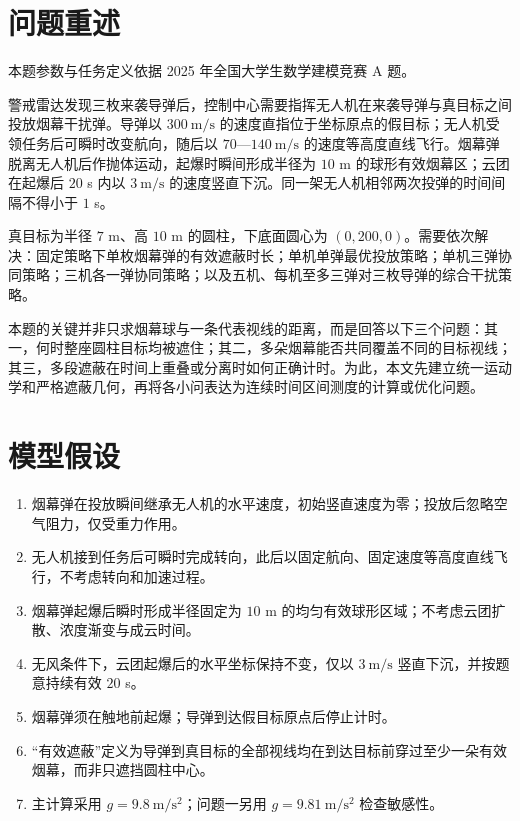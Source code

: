 \section{问题重述}
本题参数与任务定义依据 2025 年全国大学生数学建模竞赛 A 题\cite{cumcm2025a}。

警戒雷达发现三枚来袭导弹后，控制中心需要指挥无人机在来袭导弹与真目标之间投放烟幕干扰弹。导弹以 $300\ \mathrm{m/s}$ 的速度直指位于坐标原点的假目标；无人机受领任务后可瞬时改变航向，随后以 $70$—$140\ \mathrm{m/s}$ 的速度等高度直线飞行。烟幕弹脱离无人机后作抛体运动，起爆时瞬间形成半径为 $10$ m 的球形有效烟幕区；云团在起爆后 $20$ s 内以 $3\ \mathrm{m/s}$ 的速度竖直下沉。同一架无人机相邻两次投弹的时间间隔不得小于 $1$ s。

真目标为半径 $7$ m、高 $10$ m 的圆柱，下底面圆心为 $(0,200,0)$。需要依次解决：固定策略下单枚烟幕弹的有效遮蔽时长；单机单弹最优投放策略；单机三弹协同策略；三机各一弹协同策略；以及五机、每机至多三弹对三枚导弹的综合干扰策略。

本题的关键并非只求烟幕球与一条代表视线的距离，而是回答以下三个问题：其一，何时整座圆柱目标均被遮住；其二，多朵烟幕能否共同覆盖不同的目标视线；其三，多段遮蔽在时间上重叠或分离时如何正确计时。为此，本文先建立统一运动学和严格遮蔽几何，再将各小问表达为连续时间区间测度的计算或优化问题。

\section{模型假设}

\begin{enumerate}
\item 烟幕弹在投放瞬间继承无人机的水平速度，初始竖直速度为零；投放后忽略空气阻力，仅受重力作用。
\item 无人机接到任务后可瞬时完成转向，此后以固定航向、固定速度等高度直线飞行，不考虑转向和加速过程。
\item 烟幕弹起爆后瞬时形成半径固定为 $10$ m 的均匀有效球形区域；不考虑云团扩散、浓度渐变与成云时间。
\item 无风条件下，云团起爆后的水平坐标保持不变，仅以 $3\ \mathrm{m/s}$ 竖直下沉，并按题意持续有效 $20$ s。
\item 烟幕弹须在触地前起爆；导弹到达假目标原点后停止计时。
\item “有效遮蔽”定义为导弹到真目标的全部视线均在到达目标前穿过至少一朵有效烟幕，而非只遮挡圆柱中心。
\item 主计算采用 $g=9.8\ \mathrm{m/s^2}$；问题一另用 $g=9.81\ \mathrm{m/s^2}$ 检查敏感性。
\end{enumerate}

